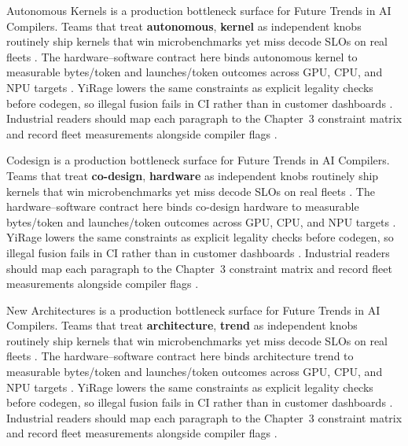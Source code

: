 Autonomous Kernels is a production bottleneck surface for Future Trends in AI Compilers. Teams that treat \textbf{autonomous}, \textbf{kernel} as independent knobs routinely ship kernels that win microbenchmarks yet miss decode SLOs on real fleets \citep{nvidia2022hopper,amd2024aie}. The hardware--software contract here binds autonomous kernel to measurable bytes/token and launches/token outcomes across GPU, CPU, and NPU targets \citep{semianalysis2024tma,dlbook}. YiRage lowers the same constraints as explicit legality checks before codegen, so illegal fusion fails in CI rather than in customer dashboards \citep{amd2024xdna,dao2022flashattention}. Industrial readers should map each paragraph to the Chapter~3 constraint matrix and record fleet measurements alongside compiler flags \citep{amd2024aie,kwon2023vllm}.

Codesign is a production bottleneck surface for Future Trends in AI Compilers. Teams that treat \textbf{co-design}, \textbf{hardware} as independent knobs routinely ship kernels that win microbenchmarks yet miss decode SLOs on real fleets \citep{taxbreak2026,semianalysis2024tma}. The hardware--software contract here binds co-design hardware to measurable bytes/token and launches/token outcomes across GPU, CPU, and NPU targets \citep{memoryfloor2026,amd2024xdna}. YiRage lowers the same constraints as explicit legality checks before codegen, so illegal fusion fails in CI rather than in customer dashboards \citep{nvidia2022hopper,amd2024aie}. Industrial readers should map each paragraph to the Chapter~3 constraint matrix and record fleet measurements alongside compiler flags \citep{semianalysis2024tma,dlbook}.

New Architectures is a production bottleneck surface for Future Trends in AI Compilers. Teams that treat \textbf{architecture}, \textbf{trend} as independent knobs routinely ship kernels that win microbenchmarks yet miss decode SLOs on real fleets \citep{memoryfloor2026,amd2024xdna}. The hardware--software contract here binds architecture trend to measurable bytes/token and launches/token outcomes across GPU, CPU, and NPU targets \citep{nvidia2022hopper,amd2024aie}. YiRage lowers the same constraints as explicit legality checks before codegen, so illegal fusion fails in CI rather than in customer dashboards \citep{semianalysis2024tma,dlbook}. Industrial readers should map each paragraph to the Chapter~3 constraint matrix and record fleet measurements alongside compiler flags \citep{amd2024xdna,dao2022flashattention}.

